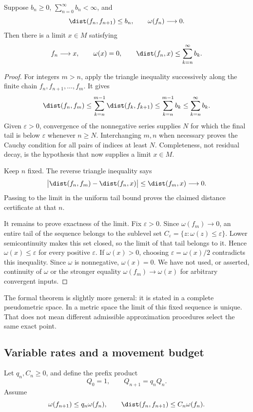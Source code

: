 \begin{theorem}\label{KS71}
Suppose \(b_n\ge0\), \(\sum_{n=0}^{\infty}b_n<\infty\), and
\[
 \dist(f_n,f_{n+1})\le b_n,\qquad \omega(f_n)\longrightarrow0.
\]
Then there is a limit \(x\in M\) satisfying
\[
 f_n\longrightarrow x,\qquad\omega(x)=0,\qquad
 \dist(f_n,x)\le\sum_{k=n}^{\infty}b_k.
\]
\end{theorem}
\begin{proof}
For integers \(m>n\), apply the triangle inequality successively along the finite chain \(f_n,f_{n+1},\ldots,f_m\). It gives
\[
 \dist(f_n,f_m)\le\sum_{k=n}^{m-1}\dist(f_k,f_{k+1})
 \le\sum_{k=n}^{m-1}b_k\le\sum_{k=n}^{\infty}b_k.
\]
Given \(\varepsilon>0\), convergence of the nonnegative series supplies \(N\) for which the final tail is below \(\varepsilon\) whenever \(n\ge N\). Interchanging \(m,n\) when necessary proves the Cauchy condition for all pairs of indices at least \(N\). Completeness, not residual decay, is the hypothesis that now supplies a limit \(x\in M\).

Keep \(n\) fixed. The reverse triangle inequality says
\[
 \bigl|\dist(f_n,f_m)-\dist(f_n,x)\bigr|\le\dist(f_m,x)\longrightarrow0.
\]
Passing to the limit in the uniform tail bound proves the claimed distance certificate at that \(n\).

It remains to prove exactness of the limit. Fix \(\varepsilon>0\). Since \(\omega(f_m)\to0\), an entire tail of the sequence belongs to the sublevel set \(C_\varepsilon=\{z:\omega(z)\le\varepsilon\}\). Lower semicontinuity makes this set closed, so the limit of that tail belongs to it. Hence \(\omega(x)\le\varepsilon\) for every positive \(\varepsilon\). If \(\omega(x)>0\), choosing \(\varepsilon=\omega(x)/2\) contradicts this inequality. Since \(\omega\) is nonnegative, \(\omega(x)=0\). We have not used, or asserted, continuity of \(\omega\) or the stronger equality \(\omega(f_m)\to\omega(x)\) for arbitrary convergent inputs.
\end{proof}
The formal theorem is slightly more general: it is stated in a complete pseudometric space. In a metric space the limit of this fixed sequence is unique. That does not mean different admissible approximation procedures select the same exact point.

\subsection{Variable rates and a movement budget}
Let \(q_n,C_n\ge0\), and define the prefix product
\[
 Q_0=1,\qquad Q_{n+1}=q_nQ_n.
\]
Assume
\begin{equation}\label{eq:variable-rate}
 \omega(f_{n+1})\le q_n\omega(f_n),\qquad
 \dist(f_n,f_{n+1})\le C_n\omega(f_n).
\end{equation}

